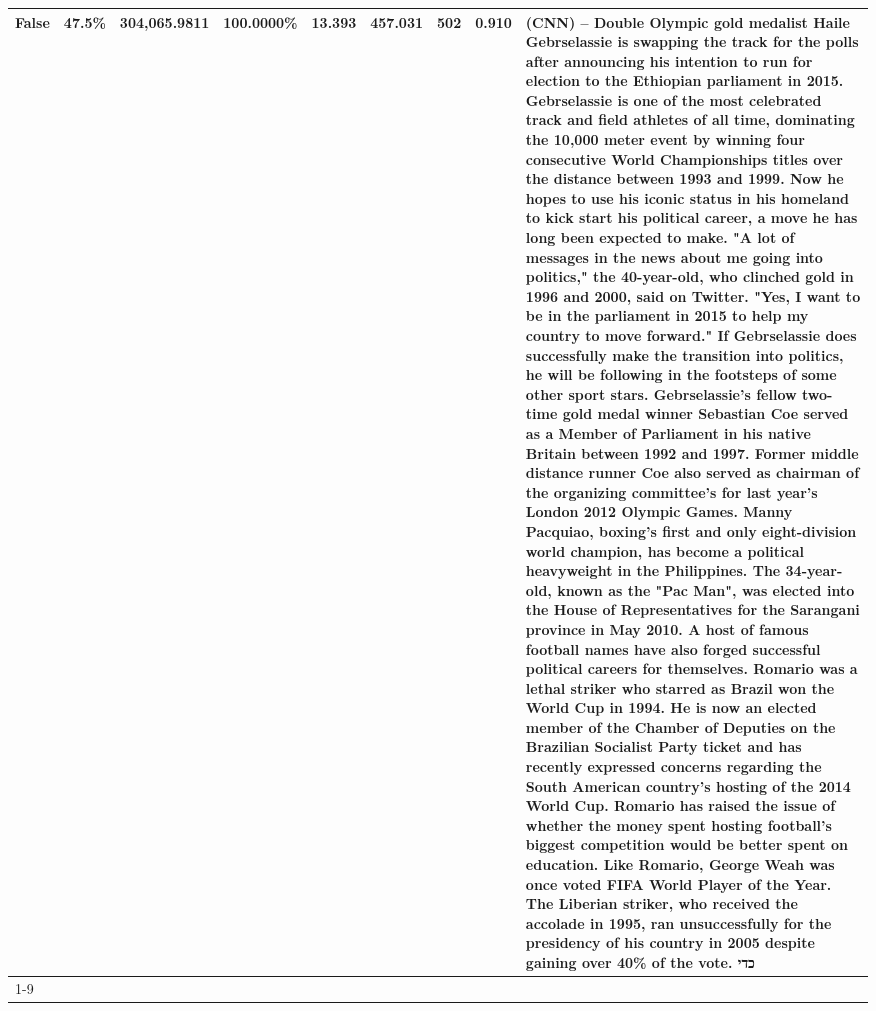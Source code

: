 \begin{table}[H]
{\begin{tabular}{lllrlllll}
False & 47.5\% & 304,065.9811 & \bfseries \color{red} 100.0000\% & 13.393 & 457.031 & 502 & 0.910 & (CNN) -- Double Olympic gold medalist Haile Gebrselassie is swapping the track for the polls after announcing his intention to run for election to the Ethiopian parliament in 2015. Gebrselassie is one of the most celebrated track and field athletes of all time, dominating the 10,000 meter event by winning four consecutive World Championships titles over the distance between 1993 and 1999. Now he hopes to use his iconic status in his homeland to kick start his political career, a move he has long been expected to make. "A lot of messages in the news about me going into politics," the 40-year-old, who clinched gold in 1996 and 2000, said on Twitter. "Yes, I want to be in the parliament in 2015 to help my country to move forward." If Gebrselassie does successfully make the transition into politics, he will be following in the footsteps of some other sport stars. Gebrselassie's fellow two-time gold medal winner Sebastian Coe served as a Member of Parliament in his native Britain between 1992 and 1997. Former middle distance runner Coe also served as chairman of the organizing committee's for last year's London 2012 Olympic Games. Manny Pacquiao, boxing's first and only eight-division world champion, has become a political heavyweight in the Philippines. The 34-year-old, known as the "Pac Man", was elected into the House of Representatives for the Sarangani province in May 2010. A host of famous football names have also forged successful political careers for themselves. Romario was a lethal striker who starred as Brazil won the World Cup in 1994. He is now an elected member of the Chamber of Deputies on the Brazilian Socialist Party ticket and has recently expressed concerns regarding the South American country's hosting of the 2014 World Cup. Romario has raised the issue of whether the money spent hosting football's biggest competition would be better spent on education. Like Romario, George Weah was once voted FIFA World Player of the Year. The Liberian striker, who received the accolade in 1995, ran unsuccessfully for the presidency of his country in 2005 despite gaining over 40\% of the vote. כדי \\
\cline{1-9}

\end{tabular}}
\end{table}
